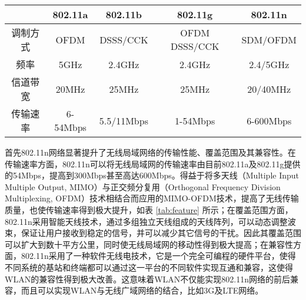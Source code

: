 \begin{table}[!htp]
\renewcommand{\arraystretch}{1}
\centering
\begin{threeparttable}[b]
\begin{tabular}{ccccc}
\hline
         & 802.11a  & 802.11b    & 802.11g       & 802.11n \\
\hline
调制方式 & OFDM     & DSSS/CCK   & OFDM DSSS/CCK & SDM/OFDM \\
频率     & 5GHz     & 2.4GHz     & 2.4GHz        & 2.4/5GHz \\
信道带宽 & 20MHz    & 25MHz      & 25MHz         & 20/40MHz \\
传输速率 & 6-54Mbps & 5.5/11Mbps & 1-54Mbps     & 6-600Mbps \\
\hline
\end{tabular}
\end{threeparttable}
\end{table}

首先802.11n网络显著提升了无线局域网络的传输性能、覆盖范围及其兼容性。在传输速率方面，802.11n可以将无线局域网的传输速率由目前802.11a及802.11g提供的54Mbps，提高到300Mbps甚至高达600Mbps。得益于将多天线（Multiple Input Multiple Output, MIMO）与正交频分复用（Orthogonal Frequency Division Multiplexing, OFDM）技术相结合而应用的MIMO-OFDM技术，提高了无线传输质量，也使传输速率得到极大提升，如表 \ref{tab:feature} 所示；在覆盖范围方面，802.11n采用智能天线技术，通过多组独立天线组成的天线阵列，可以动态调整波束，保证让用户接收到稳定的信号，并可以减少其它信号的干扰。因此其覆盖范围可以扩大到数十平方公里，同时使无线局域网的移动性得到极大提高；在兼容性方面，802.11n采用了一种软件无线电技术，它是一个完全可编程的硬件平台，使得不同系统的基站和终端都可以通过这一平台的不同软件实现互通和兼容，这使得WLAN的兼容性得到极大改善。这意味着WLAN不仅能实现802.11n网络的前后兼容，而且可以实现WLAN与无线广域网络的结合，比如3G及LTE网络。

